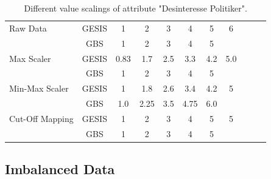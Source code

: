 \begin{table}[ht]
    \begin{center}
            {\footnotesize
            \begin{tabular}{l|c|ccccccccc}
                \hline \hline
		Raw Data & GESIS & 1 & 2 & 3 & 4 & 5 & 6 \\
                     & GBS & 1 & 2 & 3 & 4 & 5 & \\
                \hline
		Max Scaler & GESIS & 0.83 & 1.7 & 2.5 & 3.3 & 4.2 & 5.0 \\
                     & GBS & 1 & 2 & 3 & 4 & 5 & \\
                \hline
		Min-Max Scaler & GESIS & 1 & 1.8 & 2.6 & 3.4 & 4.2 & 5 \\
                     & GBS & 1.0 & 2.25 & 3.5 & 4.75 & 6.0 & \\
                \hline
		Cut-Off Mapping & GESIS & 1 & 2 & 3 & 4 & 5 & 5 \\
                     & GBS & 1 & 2 & 3 & 4 & 5 & \\
            \end{tabular}}
        \caption{Different value scalings of attribute "Desinteresse Politiker".}
\label{Tab:DescripStatsRawData}
\end{center}
\end{table}

\subsection{Imbalanced Data}
